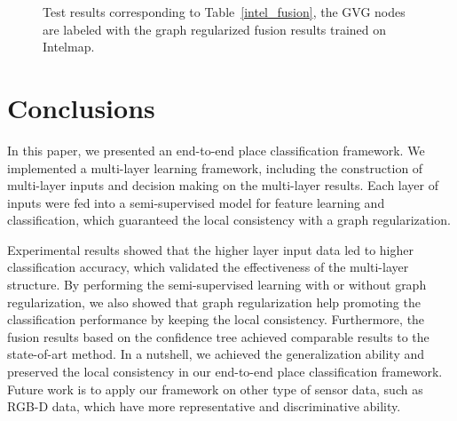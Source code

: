 \documentclass[letterpaper, 10 pt, conference]{ieeeconf}  %
\begin{document}
\begin{figure*}[tpb]
\centering
{}
\caption{Test results corresponding to Table~\ref{intel_fusion}, the GVG nodes are labeled with the graph regularized fusion results trained on Intelmap.}
\label{final}
\end{figure*}


\section{Conclusions}\label{secConclu}
In this paper, we presented an end-to-end place classification framework. We implemented a multi-layer learning framework, including the construction of multi-layer inputs and decision making on the multi-layer results. Each layer of inputs were fed into a semi-supervised model for feature learning and classification, which guaranteed the local consistency with a graph regularization.

Experimental results showed that the higher layer input data led to higher classification accuracy, which validated the effectiveness of the multi-layer structure. By performing the semi-supervised learning with or without graph regularization, we also showed that graph regularization help promoting the classification performance by keeping the local consistency. Furthermore, the fusion results based on the confidence tree achieved comparable results to the state-of-art method. In a nutshell, we achieved the generalization ability and preserved the local consistency in our end-to-end place classification framework. Future work is to apply our framework on other type of sensor data, such as RGB-D data, which have more representative and discriminative ability.










\end{document}
